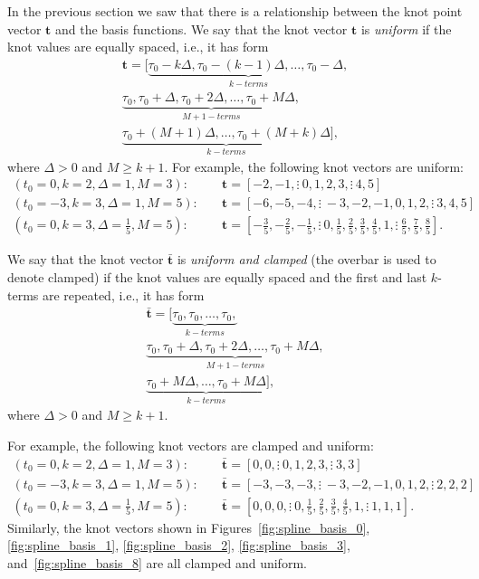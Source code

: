 \documentclass{article}
\begin{document}
In the previous section we saw that there is a relationship between the knot point vector $\mathbf{t}$ and the basis functions.  We say that the knot vector $\mathbf{t}$ is {\em uniform} if the knot values are equally spaced, i.e., it has form
\begin{multline*}
\mathbf{t} = [\underbrace{\tau_0-k\Delta, \tau_0-(k-1)\Delta, \dots, \tau_0-\Delta,}_{k-terms} \\
			 \underbrace{\tau_0, \tau_0+\Delta, \tau_0+2\Delta, \dots, \tau_0+M\Delta,}_{M+1-terms} \\
			 \underbrace{\tau_0+(M+1)\Delta, \dots, \tau_0+(M+k)\Delta}_{k-terms}],	
\end{multline*}
where $\Delta>0$ and $M\geq k+1$.  
For example, the following knot vectors are uniform:
\begin{align*}
	(t_0=0, k=2, \Delta=1, M=3):\quad & \mathbf{t} = [-2, -1, \vdots~ 0, 1, 2, 3, \vdots~ 4, 5] \\
	(t_0=-3, k=3, \Delta=1, M=5):\quad & \mathbf{t} = [-6, -5, -4,\vdots~  -3, -2, -1, 0, 1, 2, \vdots~ 3, 4, 5] \\
	(t_0=0, k=3, \Delta=\frac{1}{5}, M=5):\quad & \mathbf{t} = [-\frac{3}{5}, -\frac{2}{5}, -\frac{1}{5}, \vdots~  0, \frac{1}{5}, \frac{2}{5}, \frac{3}{5}, \frac{4}{5}, 1, \vdots~  \frac{6}{5}, \frac{7}{5}, \frac{8}{5}].	
\end{align*}

 We say that the knot vector $\bar{\mathbf{t}}$ is {\em uniform and clamped} (the overbar is used to denote clamped) if the knot values are equally spaced and the first and last $k$-terms are repeated, i.e., it has form
\begin{multline*}
\bar{\mathbf{t}} = [\underbrace{\tau_0, \tau_0, \dots, \tau_0,}_{k-terms} \\
			 \underbrace{\tau_0, \tau_0+\Delta, \tau_0+2\Delta, \dots, \tau_0+M\Delta,}_{M+1-terms} \\
			 \underbrace{\tau_0+M\Delta, \dots, \tau_0+M\Delta}_{k-terms}],	
\end{multline*}
where $\Delta>0$ and $M\geq k+1$.  

For example, the following knot vectors are clamped and uniform:
\begin{align*}
	(t_0=0, k=2, \Delta=1, M=3):\quad & \bar{\mathbf{t}} = [0, 0, \vdots~ 0, 1, 2, 3, \vdots~ 3, 3] \\
	(t_0=-3, k=3, \Delta=1, M=5):\quad & \bar{\mathbf{t}} = [-3, -3, -3, \vdots~ -3, -2, -1, 0, 1, 2, \vdots~ 2, 2, 2] \\
	(t_0=0, k=3, \Delta=\frac{1}{5}, M=5):\quad & \bar{\mathbf{t}} = [0, 0, 0, \vdots~ 0, \frac{1}{5}, \frac{2}{5}, \frac{3}{5}, \frac{4}{5}, 1, \vdots~ 1, 1, 1].	
\end{align*}
Similarly, the knot vectors shown in Figures~\ref{fig:spline_basis_0}, \ref{fig:spline_basis_1}, \ref{fig:spline_basis_2}, \ref{fig:spline_basis_3}, and~\ref{fig:spline_basis_8} are all clamped and uniform.  
\end{document}
